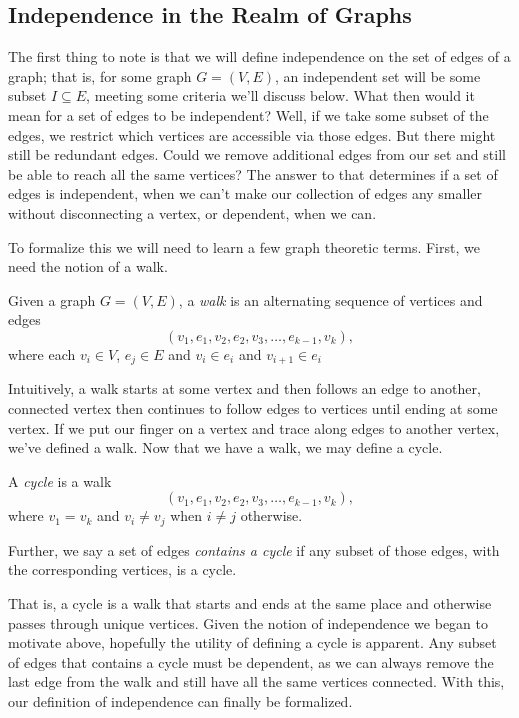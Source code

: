 \documentclass[12pt,oneside]{../../sfsuthesis}
\begin{document}
\subsection{Independence in the Realm of Graphs}

The first thing to note is that we will define independence on the set of edges of a graph;
that is, for some graph \( G = (V, E) \), an independent set will be some subset \( I \subseteq E \), meeting some criteria we'll discuss below.
What then would it mean for a set of edges to be independent?
Well, if we take some subset of the edges, we restrict which vertices are accessible via those edges.
But there might still be redundant edges.
Could we remove additional edges from our set and still be able to reach all the same vertices?
The answer to that determines if a set of edges is independent, when we can't make our collection of edges any smaller without disconnecting a vertex, or dependent, when we can.

To formalize this we will need to learn a few graph theoretic terms.
First, we need the notion of a walk.
\begin{definition}[Walk]
    Given a graph \( G = (V, E) \), a \emph{walk} is an alternating sequence of vertices and edges
    \[
        (v_1, e_1, v_2, e_2, v_3, \ldots, e_{k-1}, v_k),
    \]
    where each \( v_i \in V \), \( e_j \in E \) and \( v_i \in e_i \) and \( v_{i+1} \in e_i \)
\end{definition}
Intuitively, a walk starts at some vertex and then follows an edge to another, connected vertex then continues to follow edges to vertices until ending at some vertex.
If we put our finger on a vertex and trace along edges to another vertex, we've defined a walk.
Now that we have a walk, we may define a cycle.
\begin{definition}[Cycle]
    A \emph{cycle} is a walk
    \[
        (v_1, e_1, v_2, e_2, v_3, \ldots, e_{k-1}, v_k),
    \]
    where \( v_1 = v_k \) and \( v_i \neq v_j \) when \( i \neq j \) otherwise.

    Further, we say a set of edges \emph{contains a cycle} if any subset of those edges, with the corresponding vertices, is a cycle.
\end{definition}
That is, a cycle is a walk that starts and ends at the same place and otherwise passes through unique vertices.
Given the notion of independence we began to motivate above, hopefully the utility of defining a cycle is apparent.
Any subset of edges that contains a cycle must be dependent, as we can always remove the last edge from the walk and still have all the same vertices connected.
With this, our definition of independence can finally be formalized.
\end{document}
